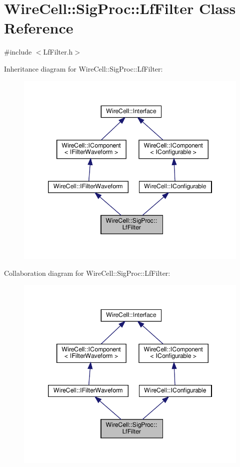 \hypertarget{class_wire_cell_1_1_sig_proc_1_1_lf_filter}{}\section{Wire\+Cell\+:\+:Sig\+Proc\+:\+:Lf\+Filter Class Reference}
\label{class_wire_cell_1_1_sig_proc_1_1_lf_filter}


{\ttfamily \#include $<$Lf\+Filter.\+h$>$}



Inheritance diagram for Wire\+Cell\+:\+:Sig\+Proc\+:\+:Lf\+Filter\+:
\nopagebreak
\begin{figure}[H]
\begin{center}
\leavevmode
\includegraphics[width=346pt]{class_wire_cell_1_1_sig_proc_1_1_lf_filter__inherit__graph}
\end{center}
\end{figure}


Collaboration diagram for Wire\+Cell\+:\+:Sig\+Proc\+:\+:Lf\+Filter\+:
\nopagebreak
\begin{figure}[H]
\begin{center}
\leavevmode
\includegraphics[width=346pt]{class_wire_cell_1_1_sig_proc_1_1_lf_filter__coll__graph}
\end{center}
\end{figure}
